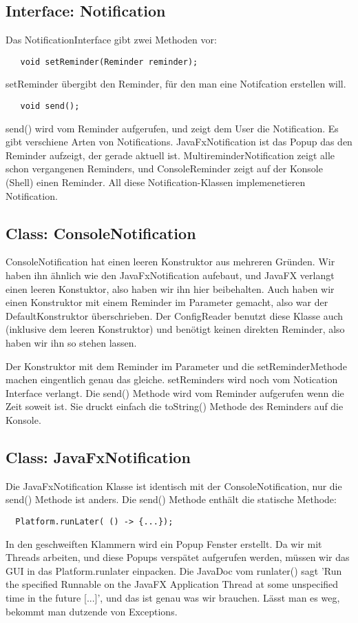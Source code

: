 \subsection{Interface: Notification}
Das NotificationInterface gibt zwei Methoden vor:

\begin{lstlisting}
   void setReminder(Reminder reminder);
\end{lstlisting}
setReminder übergibt den Reminder, für den man eine Notifcation erstellen will.

\begin{lstlisting}
   void send();
\end{lstlisting}
send() wird vom Reminder aufgerufen, und zeigt dem User die Notification. Es gibt verschiene Arten von Notifications.
JavaFxNotification ist das Popup das den Reminder aufzeigt, der gerade aktuell ist. MultireminderNotification
zeigt alle schon vergangenen Reminders, und ConsoleReminder zeigt auf der Konsole (Shell) einen Reminder.
All diese Notification-Klassen implemenetieren Notification.


\subsection{Class: ConsoleNotification}
ConsoleNotification hat einen leeren Konstruktor aus mehreren Gründen. Wir haben ihn ähnlich wie den JavaFxNotification aufebaut,
und JavaFX verlangt einen leeren Konstuktor, also haben wir ihn hier beibehalten. Auch haben wir einen Konstruktor mit einem Reminder im Parameter gemacht,
also war der DefaultKonstruktor überschrieben.
Der ConfigReader benutzt diese Klasse auch (inklusive dem leeren Konstruktor) und benötigt keinen direkten Reminder, also haben wir ihn so stehen lassen.

Der Konstruktor mit dem Reminder im Parameter und die setReminderMethode machen eingentlich genau das gleiche. setReminders wird noch vom Notication Interface verlangt.
Die send() Methode wird vom Reminder aufgerufen wenn die Zeit soweit ist. Sie druckt einfach die toString() Methode des Reminders auf die Konsole.


\subsection{Class: JavaFxNotification}
Die JavaFxNotification Klasse ist identisch mit der ConsoleNotification, nur die send() Methode ist anders.
Die send() Methode enthält die statische Methode:
\begin{lstlisting}
  Platform.runLater( () -> {...});
\end{lstlisting}
In den geschweiften Klammern wird ein Popup Fenster erstellt. Da wir mit Threads arbeiten, und diese Popups verspätet aufgerufen werden,
müssen wir das GUI in das Platform.runlater einpacken. Die JavaDoc vom runlater() sagt 'Run the specified Runnable on the JavaFX Application
Thread at some unspecified time in the future [...]',
und das ist genau was wir brauchen. Lässt man es weg, bekommt man dutzende von Exceptions.

